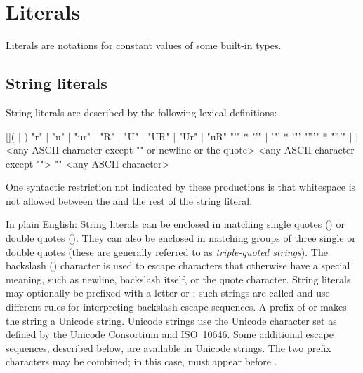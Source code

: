 \section{Literals\label{literals}}

Literals are notations for constant values of some built-in types.


\subsection{String literals\label{strings}}

String literals are described by the following lexical definitions:

\begin{productionlist}
             {[]( | )}
             {"r" | "u" | "ur" | "R" | "U" | "UR" | "Ur" | "uR"}
             {"'" * "'"
              | '"' * '"'}
             {"'''" * "'''"}
             { | }
             { | }
             {<any ASCII character except "\e" or newline or the quote>}
             {<any ASCII character except "\e">}
             {"\e" <any ASCII character>}
\end{productionlist}

One syntactic restriction not indicated by these productions is that
whitespace is not allowed between the  and
the rest of the string literal.

In plain English: String literals can be enclosed in matching single
quotes () or double quotes ().  They can also be
enclosed in matching groups of three single or double quotes (these
are generally referred to as \emph{triple-quoted strings}).  The
backslash (\code{\e}) character is used to escape characters that
otherwise have a special meaning, such as newline, backslash itself,
or the quote character.  String literals may optionally be prefixed
with a letter  or ; such strings are called
 and use different rules for interpreting
backslash escape sequences.  A prefix of  or 
makes the string a Unicode string.  Unicode strings use the Unicode character
set as defined by the Unicode Consortium and ISO~10646.  Some additional
escape sequences, described below, are available in Unicode strings.
The two prefix characters may be combined; in this case,  must
appear before .

